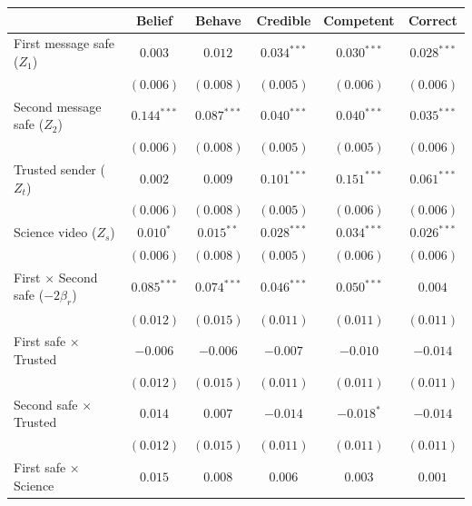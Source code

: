
\begin{table}
\begin{center}
\begin{tabular}{l c c || c c || c}
\hline
 & Belief & Behave & Credible & Competent & Correct \\
\hline
First message safe ($Z_1$)               & $0.003$       & $0.012$       & $0.034^{***}$ & $0.030^{***}$ & $0.028^{***}$ \\
                                         & $(0.006)$     & $(0.008)$     & $(0.005)$     & $(0.006)$     & $(0.006)$     \\
Second message safe ($Z_2$)              & $0.144^{***}$ & $0.087^{***}$ & $0.040^{***}$ & $0.040^{***}$ & $0.035^{***}$ \\
                                         & $(0.006)$     & $(0.008)$     & $(0.005)$     & $(0.005)$     & $(0.006)$     \\
Trusted sender ($Z_t$)                   & $0.002$       & $0.009$       & $0.101^{***}$ & $0.151^{***}$ & $0.061^{***}$ \\
                                         & $(0.006)$     & $(0.008)$     & $(0.005)$     & $(0.006)$     & $(0.006)$     \\
Science video ($Z_s$)                    & $0.010^{*}$   & $0.015^{**}$  & $0.028^{***}$ & $0.034^{***}$ & $0.026^{***}$ \\
                                         & $(0.006)$     & $(0.008)$     & $(0.005)$     & $(0.006)$     & $(0.006)$     \\
First $\times$ Second safe ($-2\beta_r$) & $0.085^{***}$ & $0.074^{***}$ & $0.046^{***}$ & $0.050^{***}$ & $0.004$       \\
                                         & $(0.012)$     & $(0.015)$     & $(0.011)$     & $(0.011)$     & $(0.011)$     \\
First safe $\times$ Trusted              & $-0.006$      & $-0.006$      & $-0.007$      & $-0.010$      & $-0.014$      \\
                                         & $(0.012)$     & $(0.015)$     & $(0.011)$     & $(0.011)$     & $(0.011)$     \\
Second safe $\times$ Trusted             & $0.014$       & $0.007$       & $-0.014$      & $-0.018^{*}$  & $-0.014$      \\
                                         & $(0.012)$     & $(0.015)$     & $(0.011)$     & $(0.011)$     & $(0.011)$     \\
First safe $\times$ Science              & $0.015$       & $0.008$       & $0.006$       & $0.003$       & $0.001$       \\

\end{tabular}
\end{center}
\end{table}
